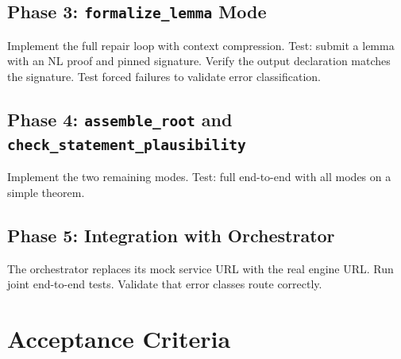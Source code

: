 \documentclass[11pt,a4paper]{article}
\begin{document}
\subsection{Phase 3: \texttt{formalize\_lemma} Mode}
Implement the full repair loop with context compression. Test: submit a lemma with an NL proof and pinned signature. Verify the output declaration matches the signature. Test forced failures to validate error classification.

\subsection{Phase 4: \texttt{assemble\_root} and \texttt{check\_statement\_plausibility}}
Implement the two remaining modes. Test: full end-to-end with all modes on a simple theorem.

\subsection{Phase 5: Integration with Orchestrator}
The orchestrator replaces its mock service URL with the real engine URL. Run joint end-to-end tests. Validate that error classes route correctly.

\section{Acceptance Criteria}
\end{document}
